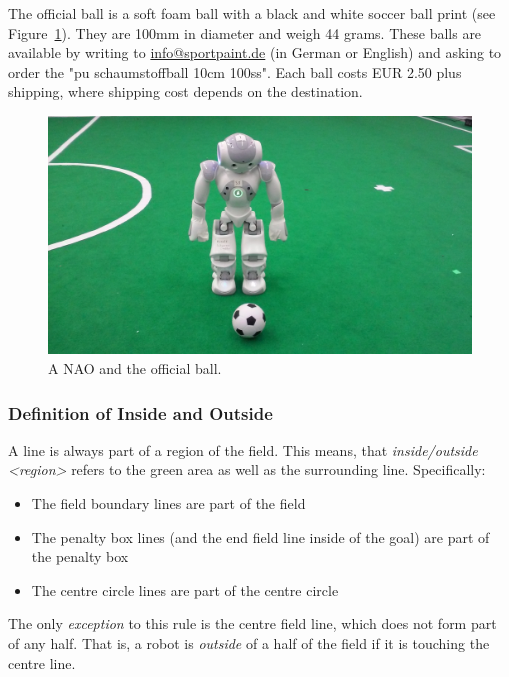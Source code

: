 The official ball is a soft foam ball with a black and white soccer ball print (see Figure~\ref{fig:ball}). They are 100mm in diameter and weigh 44 grams. These balls are available by writing to \url{info@sportpaint.de} (in German or English) and asking to order the "pu schaumstoffball 10cm 100ss".  Each ball costs EUR 2.50 plus shipping, where shipping cost depends on the destination.

\begin{figure}[t]
	\centerline{\includegraphics[height=0.28\columnwidth]{figs/robotWithBall2016.jpg}}
	\caption{A NAO and the official ball.}
	\label{fig:ball}
\end{figure}


\subsubsection{Definition of Inside and Outside}
\label{sec:inside_outside}

A line is always part of a region of the field.
This means, that \emph{inside/outside \textless region\textgreater} refers to the green area as well as the surrounding line.
Specifically:
\begin{itemize}
	\item The field boundary lines are part of the field
	\item The penalty box lines (and the end field line inside of the goal) are part of the penalty box
	\item The centre circle lines are part of the centre circle
\end{itemize}

The only \textit{exception} to this rule is the centre field line, which does not form part of any half.
That is, a robot is \textit{outside} of a half of the field if it is touching the centre line.

